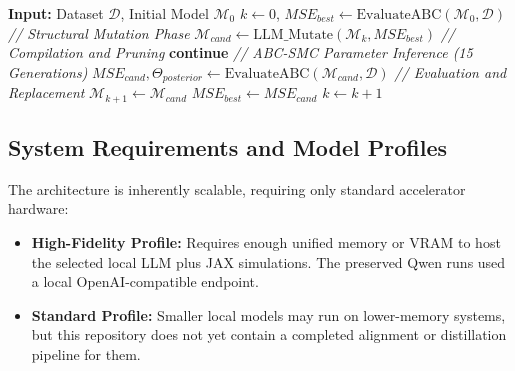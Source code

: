 \begin{algorithm}
\caption{$E^3$ Meta-Contemplation Loop}
\begin{algorithmic}[1]
\State \textbf{Input:} Dataset $\mathcal{D}$, Initial Model $\mathcal{M}_0$
\State $k \gets 0$, $MSE_{best} \gets \text{EvaluateABC}(\mathcal{M}_0, \mathcal{D})$
    \State \textit{// Structural Mutation Phase}
    \State $\mathcal{M}_{cand} \gets \text{LLM\_Mutate}(\mathcal{M}_k, MSE_{best})$
    \State \textit{// Compilation and Pruning}
        \State \textbf{continue}
    \EndIf
    \State \textit{// ABC-SMC Parameter Inference (15 Generations)}
    \State $MSE_{cand}, \Theta_{posterior} \gets \text{EvaluateABC}(\mathcal{M}_{cand}, \mathcal{D})$
    \State \textit{// Evaluation and Replacement}
        \State $\mathcal{M}_{k+1} \gets \mathcal{M}_{cand}$
        \State $MSE_{best} \gets MSE_{cand}$
        \State $k \gets k + 1$
    \EndIf
\EndWhile
\end{algorithmic}
\end{algorithm}

\subsection{System Requirements and Model Profiles}
The architecture is inherently scalable, requiring only standard accelerator hardware:
\begin{itemize}
    \item \textbf{High-Fidelity Profile:} Requires enough unified memory or VRAM to host the selected local LLM plus JAX simulations. The preserved Qwen runs used a local OpenAI-compatible endpoint.
    \item \textbf{Standard Profile:} Smaller local models may run on lower-memory systems, but this repository does not yet contain a completed alignment or distillation pipeline for them.
\end{itemize}
